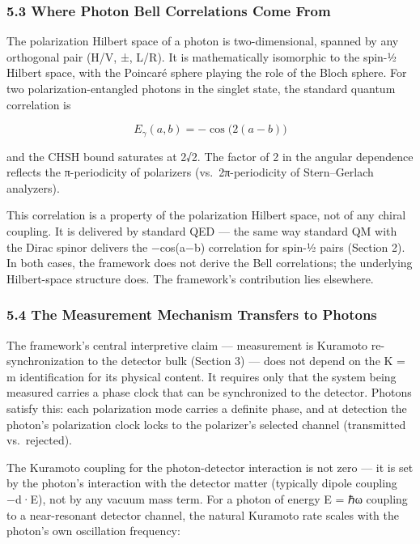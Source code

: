 \documentclass[
]{article}
\begin{document}
\subsubsection{5.3 Where Photon Bell Correlations Come
From}\label{where-photon-bell-correlations-come-from}

The polarization Hilbert space of a photon is two-dimensional, spanned
by any orthogonal pair (H/V, ±, L/R). It is mathematically isomorphic to
the spin-½ Hilbert space, with the Poincaré sphere playing the role of
the Bloch sphere. For two polarization-entangled photons in the singlet
state, the standard quantum correlation is

\[E_\gamma(a, b) = -\cos\bigl(2(a-b)\bigr)\]

and the CHSH bound saturates at 2√2. The factor of 2 in the angular
dependence reflects the π-periodicity of polarizers (vs.~2π-periodicity
of Stern--Gerlach analyzers).

This correlation is a property of the polarization Hilbert space, not of
any chiral coupling. It is delivered by standard QED --- the same way
standard QM with the Dirac spinor delivers the −cos(a−b) correlation for
spin-½ pairs (Section 2). In both cases, the framework does not derive
the Bell correlations; the underlying Hilbert-space structure does. The
framework's contribution lies elsewhere.

\subsubsection{5.4 The Measurement Mechanism Transfers to
Photons}\label{the-measurement-mechanism-transfers-to-photons}

The framework's central interpretive claim --- measurement is Kuramoto
re-synchronization to the detector bulk (Section 3) --- does not depend
on the K = m identification for its physical content. It requires only
that the system being measured carries a phase clock that can be
synchronized to the detector. Photons satisfy this: each polarization
mode carries a definite phase, and at detection the photon's
polarization clock locks to the polarizer's selected channel
(transmitted vs.~rejected).

The Kuramoto coupling for the photon-detector interaction is not zero
--- it is set by the photon's interaction with the detector matter
(typically dipole coupling −d·E), not by any vacuum mass term. For a
photon of energy E = ℏω coupling to a near-resonant detector channel,
the natural Kuramoto rate scales with the photon's own oscillation
frequency:
\end{document}
